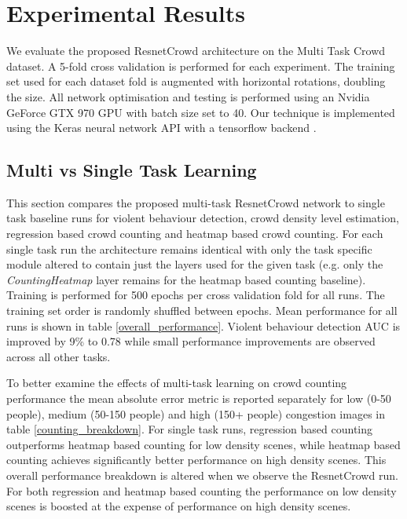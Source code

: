 \documentclass[10pt,twocolumn,letterpaper]{article}
\begin{document}
\section{Experimental Results}
 We evaluate the proposed ResnetCrowd architecture on the Multi Task Crowd dataset. A 5-fold cross validation is performed for each experiment. The training set used for each dataset fold is augmented with horizontal rotations, doubling the size. All network optimisation and testing is performed using an Nvidia GeForce GTX 970 GPU with batch size set to 40. Our technique is implemented using the Keras neural network API \cite{chollet2015keras} with a tensorflow backend \cite{abadi2015tensorflow}. 

\subsection{Multi vs Single Task Learning}
This section compares the proposed multi-task ResnetCrowd network to single task baseline runs for violent behaviour detection, crowd density level estimation, regression based crowd counting and heatmap based crowd counting. For each single task run the architecture remains identical with only the task specific module altered to contain just the layers used for the given task (e.g. only the \textit{CountingHeatmap} layer remains for the heatmap based counting baseline). Training is performed for 500 epochs per cross validation fold for all runs. The training set order is randomly shuffled between epochs. Mean performance for all runs is shown in table \ref{overall_performance}.  Violent behaviour detection AUC is improved by 9\% to 0.78 while small performance improvements are observed across all other tasks. 

To better examine the effects of  multi-task learning on crowd counting performance the mean absolute error metric is  reported separately for low (0-50 people), medium (50-150 people) and high (150+ people) congestion images in table \ref{counting_breakdown}. For single task runs, regression based counting outperforms heatmap based counting for low density scenes, while heatmap based counting achieves significantly better performance on high density scenes. This overall performance breakdown is altered when we observe the ResnetCrowd run. For both regression and heatmap based counting the performance on low density scenes is boosted at the expense of performance on high density scenes.
  
\end{document}
